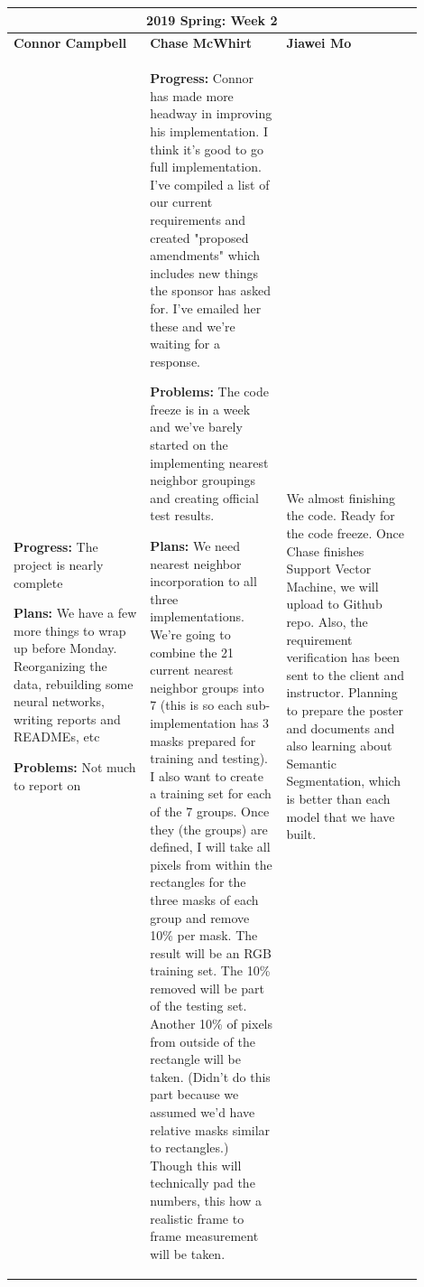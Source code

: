 \documentclass[10pt,journal,compsoc, draftclsnofoot,onecolumn]{IEEEtran}
\begin{document}
\begin{center}
\begin{tabular}{|p{0.3\linewidth}|p{0.3\linewidth}|p{0.3\linewidth}|}
\hline
\multicolumn{3}{|c|}{\textbf{2019 Spring: Week 2}} \\
\hline
\textbf{Connor Campbell} & \textbf{Chase McWhirt} & \textbf{Jiawei Mo} \\ [0.5ex]
\hline\hline

\textbf{Progress:} The project is nearly complete

\textbf{Plans:} We have a few more things to wrap up before Monday. Reorganizing the data, rebuilding some neural networks, writing reports and READMEs, etc

\textbf{Problems:} Not much to report on
&
\textbf{Progress:} Connor has made more headway in improving his implementation.
I think it's good to go full implementation.
I've compiled a list of our current requirements and created "proposed amendments" which includes new things the sponsor has asked for.
I've emailed her these and we're waiting for a response.

\textbf{Problems:} The code freeze is in a week and we've barely started on the implementing nearest neighbor groupings and creating official test results.

\textbf{Plans:} We need nearest neighbor incorporation to all three implementations.
We're going to combine the 21 current nearest neighbor groups into 7 (this is so each sub-implementation has 3 masks prepared for training and testing).
I also want to create a training set for each of the 7 groups.
Once they (the groups) are defined, I will take all pixels from within the rectangles for the three masks of each group and remove 10\% per mask.
The result will be an RGB training set.
The 10\% removed will be part of the testing set.
Another 10\% of pixels from outside of the rectangle will be taken.
(Didn't do this part because we assumed we'd have relative masks similar to rectangles.)
Though this will technically pad the numbers, this how a realistic frame to frame measurement will be taken. 
&
We almost finishing the code. Ready for the code freeze. Once Chase finishes Support Vector Machine, we will upload to Github repo. Also, the requirement verification has been sent to the client and instructor. Planning to prepare the poster and documents and also learning about Semantic Segmentation, which is better than each model that we have built.
\\ \hline
\end{tabular}
\end{center}
\end{document}
